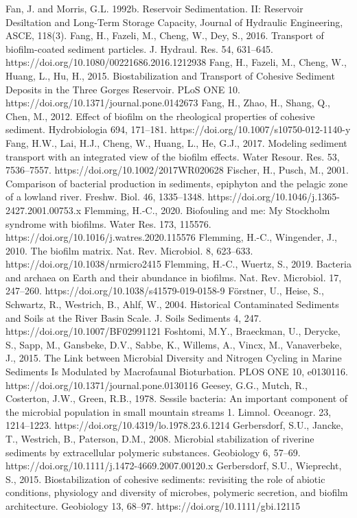 \begin{thebibliography}{}
Fan, J. and Morris, G.L. 1992b. Reservoir Sedimentation. II: Reservoir Desiltation and Long-Term Storage Capacity, Journal of Hydraulic Engineering, ASCE, 118(3).
Fang, H., Fazeli, M., Cheng, W., Dey, S., 2016. Transport of biofilm-coated sediment particles. J. Hydraul. Res. 54, 631–645. https://doi.org/10.1080/00221686.2016.1212938
Fang, H., Fazeli, M., Cheng, W., Huang, L., Hu, H., 2015. Biostabilization and Transport of Cohesive Sediment Deposits in the Three Gorges Reservoir. PLoS ONE 10. https://doi.org/10.1371/journal.pone.0142673
Fang, H., Zhao, H., Shang, Q., Chen, M., 2012. Effect of biofilm on the rheological properties of cohesive sediment. Hydrobiologia 694, 171–181. https://doi.org/10.1007/s10750-012-1140-y
Fang, H.W., Lai, H.J., Cheng, W., Huang, L., He, G.J., 2017. Modeling sediment transport with an integrated view of the biofilm effects. Water Resour. Res. 53, 7536–7557. https://doi.org/10.1002/2017WR020628
Fischer, H., Pusch, M., 2001. Comparison of bacterial production in sediments, epiphyton and the pelagic zone of a lowland river. Freshw. Biol. 46, 1335–1348. https://doi.org/10.1046/j.1365-2427.2001.00753.x
Flemming, H.-C., 2020. Biofouling and me: My Stockholm syndrome with biofilms. Water Res. 173, 115576. https://doi.org/10.1016/j.watres.2020.115576
Flemming, H.-C., Wingender, J., 2010. The biofilm matrix. Nat. Rev. Microbiol. 8, 623–633. https://doi.org/10.1038/nrmicro2415
Flemming, H.-C., Wuertz, S., 2019. Bacteria and archaea on Earth and their abundance in biofilms. Nat. Rev. Microbiol. 17, 247–260. https://doi.org/10.1038/s41579-019-0158-9
Förstner, U., Heise, S., Schwartz, R., Westrich, B., Ahlf, W., 2004. Historical Contaminated Sediments and Soils at the River Basin Scale. J. Soils Sediments 4, 247. https://doi.org/10.1007/BF02991121
Foshtomi, M.Y., Braeckman, U., Derycke, S., Sapp, M., Gansbeke, D.V., Sabbe, K., Willems, A., Vincx, M., Vanaverbeke, J., 2015. The Link between Microbial Diversity and Nitrogen Cycling in Marine Sediments Is Modulated by Macrofaunal Bioturbation. PLOS ONE 10, e0130116. https://doi.org/10.1371/journal.pone.0130116
Geesey, G.G., Mutch, R., Costerton, J.W., Green, R.B., 1978. Sessile bacteria: An important component of the microbial population in small mountain streams 1. Limnol. Oceanogr. 23, 1214–1223. https://doi.org/10.4319/lo.1978.23.6.1214
Gerbersdorf, S.U., Jancke, T., Westrich, B., Paterson, D.M., 2008. Microbial stabilization of riverine sediments by extracellular polymeric substances. Geobiology 6, 57–69. https://doi.org/10.1111/j.1472-4669.2007.00120.x
Gerbersdorf, S.U., Wieprecht, S., 2015. Biostabilization of cohesive sediments: revisiting the role of abiotic conditions, physiology and diversity of microbes, polymeric secretion, and biofilm architecture. Geobiology 13, 68–97. https://doi.org/10.1111/gbi.12115

\end{thebibliography}
